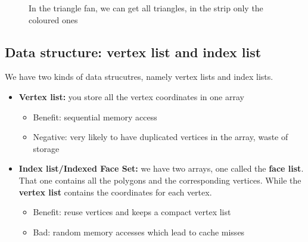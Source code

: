 \documentclass[11pt]{article}
\begin{document}

\begin{figure}[h]
    \centering
    \hfill
    \caption{In the triangle fan, we can get all triangles, in the strip only the coloured ones}
  \end{figure}

\subsection{Data structure: vertex list and index list}
We have two kinds of data strucutres, namely vertex lists and index lists. 
\begin{itemize}
    \item \textbf{Vertex list:} you store all the vertex coordinates in one array \begin{itemize}
        \item Benefit: sequential memory access
        \item Negative: very likely to have duplicated vertices in the array, waste of storage
    \end{itemize}
    \item \textbf{Index list/Indexed Face Set:} we have two arrays, one called the \textbf{face list}. That one contains all the polygons and the corresponding vertices. While the \textbf{vertex list} contains the coordinates for each vertex. \begin{itemize}
        \item Benefit: reuse vertices and keeps a compact vertex list
        \item Bad: random memory accesses which lead to cache misses
    \end{itemize}
\end{itemize}
\end{document}
